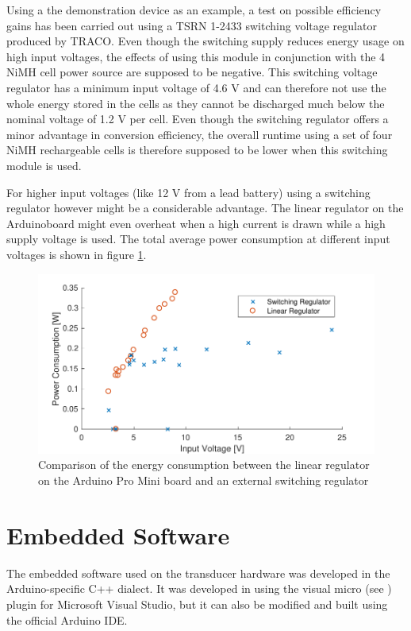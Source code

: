 Using a the demonstration device as an example, a test on possible efficiency gains has been carried out using a TSRN 1-2433 switching voltage regulator produced by TRACO. Even though the switching supply reduces energy usage on high input voltages, the effects of using this module in conjunction with the 4 NiMH cell power source are supposed to be negative. This switching voltage regulator has a minimum input voltage of 4.6 V and can therefore not use the whole energy stored in the cells as they cannot be discharged much below the nominal voltage of 1.2 V per cell. Even though the switching regulator offers a minor advantage in conversion efficiency, the overall runtime using a set of four NiMH rechargeable cells is therefore supposed to be lower when this switching module is used.

For higher input voltages (like 12 V from a lead battery) using a switching regulator however might be a considerable advantage. The linear regulator on the Arduinoboard might even overheat when a high current is drawn while a high supply voltage is used. The total average power consumption at different input voltages is shown in figure \ref{fig:switching_linear}.

\begin{figure}[ht]
\centering
\includegraphics[width=1.0\textwidth]{src/switching_linear.pdf}
\caption{Comparison of the energy consumption between the linear regulator on the Arduino Pro Mini board and an external switching regulator}
\label{fig:switching_linear}
\end{figure}

\section{Embedded Software}
The embedded software used on the transducer hardware was developed in the Arduino-specific C++ dialect. It was developed in using the visual micro (see \cite{vMicro}) plugin for Microsoft Visual Studio, but it can also be modified and built using the official Arduino IDE. 

